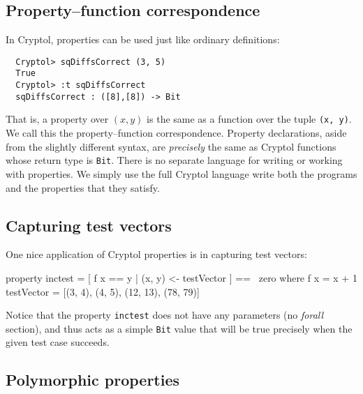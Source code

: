 \subsection{Property--function correspondence}\indThmFuncCorr
\label{sec:prop-funct-corr}

In Cryptol, properties can be used just like ordinary definitions:
\begin{Verbatim}
  Cryptol> sqDiffsCorrect (3, 5)
  True
  Cryptol> :t sqDiffsCorrect
  sqDiffsCorrect : ([8],[8]) -> Bit
\end{Verbatim}
That is, a property over {\tt$(x, y)$} is the same as a function over
the tuple {\tt (x, y)}. We call this the property--function
correspondence. Property declarations, aside from the slightly
different syntax, are \emph{precisely} the same as Cryptol functions
whose return type is \texttt{Bit}. There is no separate language for
writing or working with properties. We simply use the full Cryptol
language write both the programs and the properties that they satisfy.

\subsection{Capturing test vectors}
\label{sec:thmvec}

One nice application of Cryptol properties is in capturing test
vectors:\indZero
\begin{code}
  property inctest = [ f x == y | (x, y) <- testVector ] == ~zero
    where  f x = x + 1
           testVector = [(3, 4), (4, 5), (12, 13), (78, 79)]
\end{code}
Notice that the property \texttt{inctest} does not have any parameters
(no \emph{forall} section), and thus acts as a simple \texttt{Bit} value
that will be true precisely when the given test case succeeds.


\subsection{Polymorphic properties}
\label{sec:polythm}

